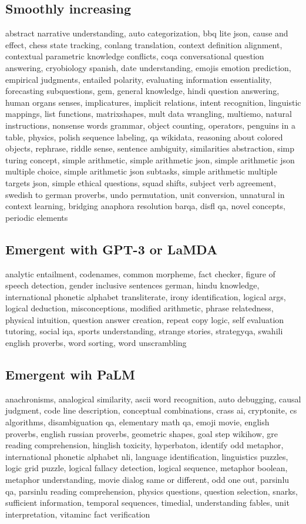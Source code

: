 \documentclass[10pt]{article} %
\begin{document}
\subsection{Smoothly increasing}
abstract narrative understanding, auto categorization, bbq lite json, cause and effect, chess state tracking, conlang translation, context definition alignment, contextual parametric knowledge conflicts, coqa conversational question answering, cryobiology spanish, date understanding, emojis emotion prediction, empirical judgments, entailed polarity, evaluating information essentiality, forecasting subquestions, gem, general knowledge, hindi question answering, human organs senses, implicatures, implicit relations, intent recognition, linguistic mappings, list functions, matrixshapes, mult data wrangling, multiemo, natural instructions, nonsense words grammar, object counting, operators, penguins in a table, physics, polish sequence labeling, qa wikidata, reasoning about colored objects, rephrase, riddle sense, sentence ambiguity, similarities abstraction, simp turing concept, simple arithmetic, simple arithmetic json, simple arithmetic json multiple choice, simple arithmetic json subtasks, simple arithmetic multiple targets json, simple ethical questions, squad shifts, subject verb agreement, swedish to german proverbs, undo permutation, unit conversion, unnatural in context learning, bridging anaphora resolution barqa, disfl qa, novel concepts, periodic elements

\subsection{Emergent with GPT-3 or LaMDA}
analytic entailment, codenames, common morpheme, fact checker, figure of speech detection, gender inclusive sentences german, hindu knowledge, international phonetic alphabet transliterate, irony identification, logical args, logical deduction, misconceptions, modified arithmetic, phrase relatedness, physical intuition, question answer creation, repeat copy logic, self evaluation tutoring, social iqa, sports understanding, strange stories, strategyqa, swahili english proverbs, word sorting, word unscrambling

\subsection{Emergent wih PaLM}
anachronisms, analogical similarity, ascii word recognition, auto debugging, causal judgment, code line description, conceptual combinations, crass ai, cryptonite, cs algorithms, disambiguation qa, elementary math qa, emoji movie, english proverbs, english russian proverbs, geometric shapes, goal step wikihow, gre reading comprehension, hinglish toxicity, hyperbaton, identify odd metaphor, international phonetic alphabet nli, language identification, linguistics puzzles, logic grid puzzle, logical fallacy detection, logical sequence, metaphor boolean, metaphor understanding, movie dialog same or different, odd one out, parsinlu qa, parsinlu reading comprehension, physics questions, question selection, snarks, sufficient information, temporal sequences, timedial, understanding fables, unit interpretation, vitaminc fact verification
\end{document}

